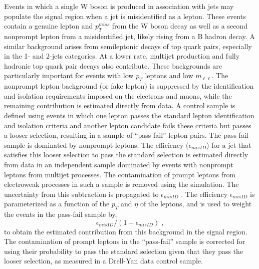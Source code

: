 Events in which a single W boson is produced in association with jets may populate the signal
region when a jet is misidentified as a lepton. 
These events contain a genuine lepton and $p_T^{miss}$ from the W boson decay as well as a second nonprompt lepton from a misidentified jet, likely
rising from a B hadron decay. A similar background arises from semileptonic decays of top
quark pairs, especially in the 1- and 2-jets categories. At a lower rate, multijet production
and fully hadronic top quark pair decays also contribute. These backgrounds are particularly
important for events with low  $p_T$ leptons and low $m_{\ell \ell}$.
The nonprompt lepton background (or fake lepton) is suppressed by the identification and isolation requirements 
imposed on the electrons and muons, while the remaining contribution is estimated
directly from data. A control sample is defined using events in which one lepton passes the
standard lepton identification and isolation criteria and another lepton candidate fails these
criteria but passes a looser selection, resulting in a sample of ``pass-fail'' lepton pairs. 
The pass-fail sample is dominated by nonprompt leptons. The efficiency ($\epsilon_{misID}$) for a jet that satisfies this
looser selection to pass the standard selection is estimated directly from data in an independent
sample dominated by events with nonprompt leptons from multijet processes. 
The contamination of prompt leptons from electroweak processes in such a sample is removed using the
simulation. The uncertainty from this subtraction is propagated to  $\epsilon_{misID}$ . 
The efficiency  $\epsilon_{misID}$  is parameterized as a function of the $p_T$ and $\eta$ of the leptons, 
and is used to weight the events in the pass-fail sample by,  
\begin{equation}
\epsilon_{misID}/(1-\epsilon_{misID}) \; , 
\end{equation}
to obtain the estimated contribution from this background in the signal region. 
The contamination of prompt leptons in the ``pass-fail'' 
sample is corrected for using their probability to pass the standard selection given that they pass
the looser selection, as measured in a Drell-Yan data control sample. 
